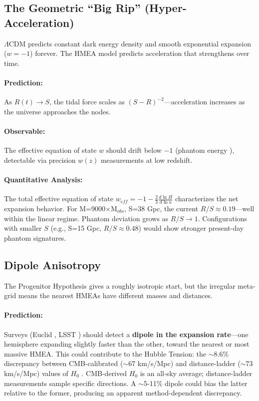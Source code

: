 \documentclass{article}
\begin{document}
\subsection{The Geometric ``Big Rip'' (Hyper-Acceleration)}
\label{sec:phantom}
$\Lambda$CDM predicts constant dark energy density and smooth exponential expansion ($w = -1$) forever.
The HMEA model predicts acceleration that strengthens over time.

\paragraph{Prediction:} As $R(t) \rightarrow S$, the tidal force scales as $(S-R)^{-2}$—acceleration increases as the universe approaches the nodes.

\paragraph{Observable:} The effective equation of state $w$ should drift below $-1$ (phantom energy \cite{Caldwell2003}), detectable via precision $w(z)$ measurements at low redshift.

\paragraph{Quantitative Analysis:}
The total effective equation of state $w_{eff} = -1 - \frac{2}{3}\frac{d \ln H}{d \ln a}$ characterizes the net expansion behavior.
For M=9000$\times$M$_{obs}$, S=38 Gpc, the current $R/S \approx 0.19$—well within the linear regime.
Phantom deviation grows as $R/S \rightarrow 1$.
Configurations with smaller $S$ (e.g., S=15 Gpc, $R/S \approx 0.48$) would show stronger present-day phantom signatures.

\subsection{Dipole Anisotropy}
\label{sec:dipole}
The Progenitor Hypothesis gives a roughly isotropic start, but the irregular meta-grid means the nearest HMEAs have different masses and distances.

\paragraph{Prediction:} Surveys (Euclid \cite{Euclid2011}, LSST \cite{LSST2019}) should detect a \textbf{dipole in the expansion rate}—one hemisphere expanding slightly faster than the other, toward the nearest or most massive HMEA.
This could contribute to the Hubble Tension: the $\sim$8.6\% discrepancy between CMB-calibrated ($\sim$67 km/s/Mpc) and distance-ladder ($\sim$73 km/s/Mpc) values of $H_0$ \cite{Riess2022, DiValentino2021}.
CMB-derived $H_0$ is an all-sky average; distance-ladder measurements sample specific directions.
A $\sim$5-11\% dipole could bias the latter relative to the former, producing an apparent method-dependent discrepancy.
\end{document}
